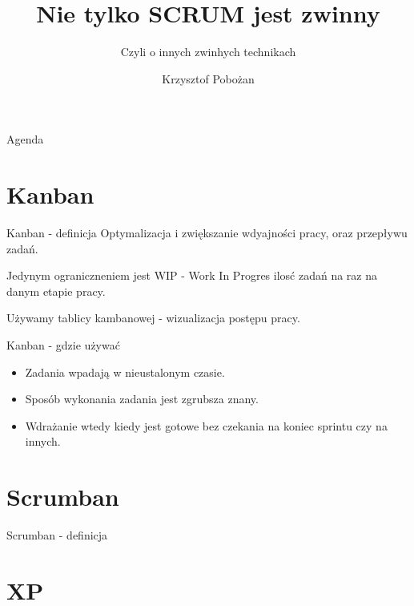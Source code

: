 \documentclass[epic,eepic,aspectratio=169,12pt]{beamer}
\title{Nie tylko SCRUM jest zwinny}
\author{Krzysztof Pobożan}
\subtitle{Czyli o innych zwinhych technikach}
\begin{document}
\begin{frame}
	\maketitle
\end{frame}
	\begin{frame}{Agenda}
		\tableofcontents
	\end{frame}
\section{Kanban}
\begin{frame}{Kanban - definicja}
	Optymalizacja i zwiększanie wdyajności pracy, oraz przepływu zadań.
	
	Jedynym ograniczneniem jest WIP - Work In Progres ilosć zadań na raz na danym etapie pracy.
	
	Używamy tablicy kambanowej - wizualizacja postępu pracy.
	
\end{frame}
\begin{frame}{Kanban - gdzie używać}
	\begin{itemize}
		\item Zadania wpadają w nieustalonym czasie.
		\item Sposób wykonania zadania jest zgrubsza znany.
		\item Wdrażanie wtedy kiedy jest gotowe bez czekania na koniec sprintu czy na innych.
	\end{itemize}
\end{frame}
\section{Scrumban}
\begin{frame}{Scrumban - definicja}
	
\end{frame}
\section{XP}
\end{document}
